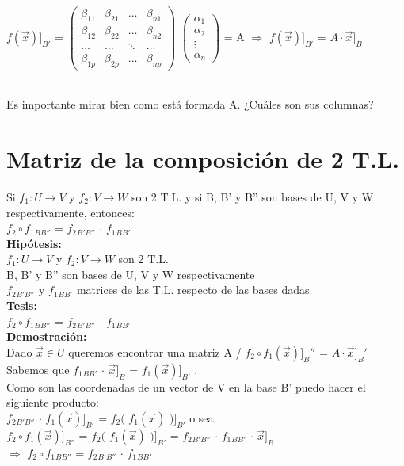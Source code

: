 \documentclass[11pt]{article}
\begin{document}
\noindent
$f(\vec{x})]_{B'}$ = 
$\begin{pmatrix} 
\beta_{11} & \beta_{21} & \ldots & \beta_{n1} \\
\beta_{12} & \beta_{22} & \ldots & \beta_{n2}\\
\ldots & \ldots & \ddots & \ldots \\
\beta_{1p} & \beta_{2p} & \ldots & \beta_{np}
\end{pmatrix}$
$\begin{pmatrix} 
\alpha_{1}\\
\alpha_{2}\\
\vdots\\
\alpha_{n}
\end{pmatrix}$ = A $\Rightarrow$ $f(\vec{x})]_{B'}$ = $A \cdot \vec{x}]_B$

\noindent \\
Es importante mirar bien como está formada A. ¿Cuáles son sus columnas? 

\noindent
\section{Matriz de la composición de 2 T.L.}
Si $f_1 : U \rightarrow V$ y $f_2 : V \rightarrow W$ son 2 T.L. y si B, B' y B'' son bases de U, V y W respectivamente, entonces: \\
\textbardbl $f_2 \circ f_1$\textbardbl$_{BB''}$ = 
\textbardbl $f_2$\textbardbl$_{B'B''}$ $\cdot$
\textbardbl $f_1$\textbardbl$_{BB'}$ \\
{\bfseries {Hipótesis:}} \\
$f_1 : U \rightarrow V$ y $f_2 : V \rightarrow W$ son 2 T.L. \\
B, B' y B'' son bases de U, V y W respectivamente \\
\textbardbl $f_2$\textbardbl$_{B'B''}$ y
\textbardbl $f_1$\textbardbl$_{BB'}$ matrices de las T.L. respecto de las bases dadas. \\
{\bfseries {Tesis:}} \\
\textbardbl $f_2 \circ f_1$\textbardbl$_{BB''}$ = 
\textbardbl $f_2$\textbardbl$_{B'B''}$ $\cdot$
\textbardbl $f_1$\textbardbl$_{BB'}$ \\
{\bfseries {Demostración:}} \\
Dado $\vec{x} \in U$ queremos encontrar una matriz A / $f_2 \circ f_1 (\vec{x})]_B''$ = $A \cdot \vec{x}]_B'$ \\
Sabemos que \textbardbl $f_1$\textbardbl$_{BB'}$ $\cdot$ $\vec{x}]_B$ = $f_1(\vec{x})]_{B'}$ . \\
Como son las coordenadas de un vector de V en la base B' puedo hacer el siguiente producto: \\
\textbardbl $f_2$\textbardbl$_{B'B''}$ $\cdot$ $f_1(\vec{x})]_{B'}$ 
= $f_2($ $f_1(\vec{x})$ $)]_{B'}$ o sea\\
$f_2 \circ f_1 (\vec{x})]_{B''}$ =
$f_2($ $f_1(\vec{x})$ $)]_{B'}$ =
\textbardbl $f_2$\textbardbl$_{B'B''}$ $\cdot$
\textbardbl $f_1$\textbardbl$_{BB'}$ $\cdot$ $\vec{x}]_{B}$ \\
$\Rightarrow$ \textbardbl $f_2 \circ f_1$\textbardbl$_{BB''}$ = 
\textbardbl $f_2$\textbardbl$_{B'B''}$ $\cdot$
\textbardbl $f_1$\textbardbl$_{BB'}$
\end{document}
